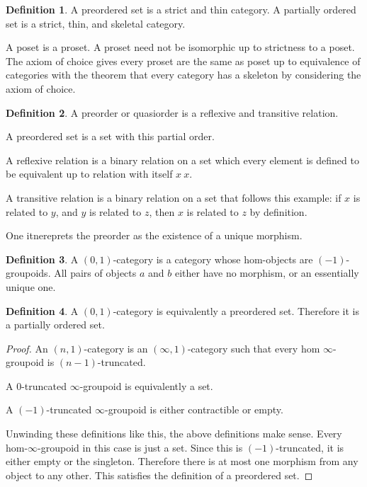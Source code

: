 \documentclass[10pt]{article}
\theoremstyle{plain}%
\theoremstyle{definition}
\newtheorem{definition}{Definition}[section]
\theoremstyle{remark}
\begin{document}
\begin{definition}
	A preordered set is a strict and thin category. A partially ordered set is a strict, thin, and skeletal category.
\end{definition}

A poset is a proset. A proset need not be isomorphic up to strictness to a poset. The axiom of choice gives every proset are the same as poset up to equivalence of categories with the theorem that every category has a skeleton by considering the axiom of choice.

\begin{definition}
	A preorder or quasiorder is a reflexive and transitive relation.

	A preordered set is a set with this partial order.

	A reflexive relation is a binary relation on a set which every element is defined to be equivalent up to relation with itself $x ~ x$.

	A transitive relation is a binary relation on a set that follows this example: if $x$ is related to $y$, and $y$ is related to $z$, then $x$ is related to $z$ by definition.
\end{definition}

One itnereprets the preorder as the existence of a unique morphism.

\begin{definition}
	A $(0,1)$-category is a category whose hom-objects are $(-1)$-groupoids. All pairs of objects $a$ and $b$ either have no morphism, or an essentially unique one. 
\end{definition}

\begin{definition}
	A $(0,1)$-category is equivalently a preordered set. Therefore it is a partially ordered set.
\end{definition}

\begin{proof}
	An $(n,1)$-category is an $(\infty,1)$-category such that every hom $\infty$-groupoid is $(n-1)$-truncated.
	
	A $0$-truncated $\infty$-groupoid is equivalently a set.
	
	A $(-1)$-truncated $\infty$-groupoid is either contractible or empty.

	Unwinding these definitions like this, the above definitions make sense. Every hom-$\infty$-groupoid in this case is just a set. Since this is $(-1)$-truncated, it is either empty or the singleton. Therefore there is at most one morphism from any object to any other. This satisfies the definition of a preordered set.
\end{proof}
\end{document}
